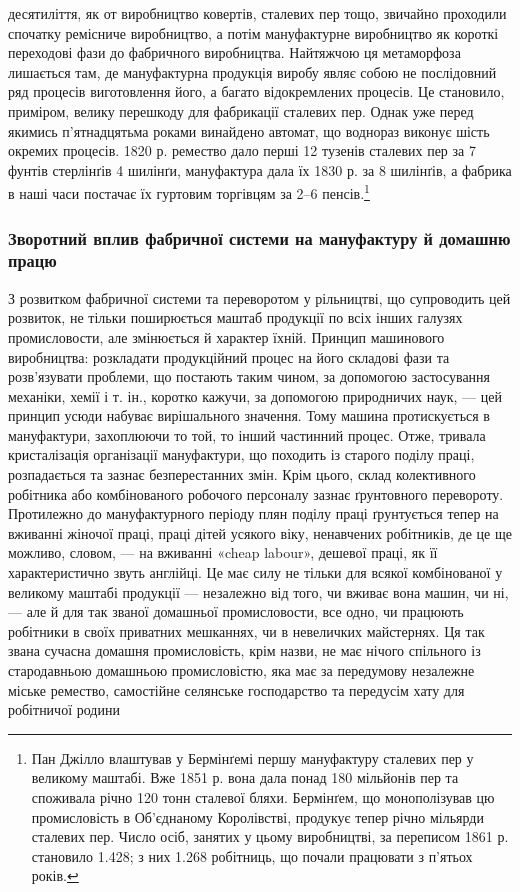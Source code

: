 \parcont{}  %
десятиліття, як от виробництво ковертів, сталевих пер тощо, звичайно
проходили спочатку ремісниче виробництво, а потім мануфактурне
виробництво як короткі переходові фази до фабричного
виробництва. Найтяжчою ця метаморфоза лишається там, де мануфактурна
продукція виробу являє собою не послідовний ряд процесів
виготовлення його, а багато відокремлених процесів. Це становило,
приміром, велику перешкоду для фабрикації сталевих пер.
Однак уже перед якимись п’ятнадцятьма роками винайдено автомат,
що воднораз виконує шість окремих процесів. 1820 р. ремество
дало перші 12 тузенів сталевих пер за 7 фунтів стерлінґів 4 шилінґи,
мануфактура дала їх 1830 р. за 8 шилінґів, а фабрика в
наші часи постачає їх гуртовим торгівцям за 2--6 пенсів.\footnote{
Пан Джілло влаштував у Бермінґемі першу мануфактуру сталевих
пер у великому маштабі. Вже 1851 р. вона дала понад 180 мільйонів пер
та споживала річно 120 тонн сталевої бляхи. Бермінґем, що монополізував
цю промисловість в Об’єднаному Королівстві, продукує тепер річно
мільярди сталевих пер. Число осіб, занятих у цьому виробництві, за
переписом 1861 р. становило 1.428; з них 1.268 робітниць, що почали
працювати з п’ятьох років.
}

\subsubsection{Зворотний вплив фабричної системи
на мануфактуру й домашню працю}

З розвитком фабричної системи та переворотом у рільництві, що
супроводить цей розвиток, не тільки поширюється маштаб продукції
по всіх інших галузях промисловости, але змінюється й характер
їхній. Принцип машинового виробництва: розкладати продукційний
процес на його складові фази та розв’язувати проблеми,
що постають таким чином, за допомогою застосування механіки,
хемії і т. ін., коротко кажучи, за допомогою природничих наук, —
цей принцип усюди набуває вирішального значення. Тому машина
протискується в мануфактури, захоплюючи то той, то інший
частинний процес. Отже, тривала кристалізація організації мануфактури,
що походить із старого поділу праці, розпадається
та зазнає безперестанних змін. Крім цього, склад колективного
робітника або комбінованого робочого персоналу зазнає ґрунтовного
перевороту. Протилежно до мануфактурного періоду
плян поділу праці ґрунтується тепер на вживанні жіночої праці,
праці дітей усякого віку, ненавчених робітників, де це ще
можливо, словом, — на вживанні «cheap labour», дешевої праці,
як її характеристично звуть англійці. Це має силу не тільки для
всякої комбінованої у великому маштабі продукції — незалежно
від того, чи вживає вона машин, чи ні, — але й для так званої
домашньої промисловости, все одно, чи працюють робітники в
своїх приватних мешканнях, чи в невеличких майстернях. Ця
так звана сучасна домашня промисловість, крім назви, не має
нічого спільного із стародавньою домашньою промисловістю,
яка має за передумову незалежне міське ремество, самостійне
селянське господарство та передусім хату для робітничої родини
\parbreak{}  %
